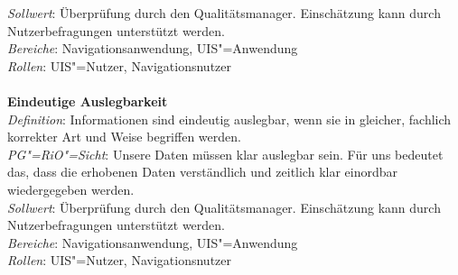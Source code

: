 \textit{Sollwert}: Überprüfung durch den Qualitätsmanager. Einschätzung kann durch Nutzerbefragungen unterstützt werden. \\
\textit{Bereiche}: Navigationsanwendung, UIS"=Anwendung \\
\textit{Rollen}: UIS"=Nutzer, Navigationsnutzer \\
\\
\textbf{Eindeutige Auslegbarkeit}\\
\textit{Definition}: Informationen sind eindeutig auslegbar, wenn sie in gleicher, fachlich korrekter Art und Weise begriffen werden. \\
\textit{PG"=RiO"=Sicht}: Unsere Daten müssen klar auslegbar sein. Für uns bedeutet das, dass die erhobenen Daten verständlich und zeitlich klar einordbar wiedergegeben werden. \\
\textit{Sollwert}: Überprüfung durch den Qualitätsmanager. Einschätzung kann durch Nutzerbefragungen unterstützt werden. \\
\textit{Bereiche}: Navigationsanwendung, UIS"=Anwendung \\
\textit{Rollen}: UIS"=Nutzer, Navigationsnutzer \\

